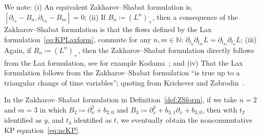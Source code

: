 \documentclass[5p,twocolumn]{elsarticle}
\newcommand*{\pa}{{\partial}}
\begin{document}
\begin{remark}
  We note:
  (i) An equivalent Zakharov--Shabat formulation is, $[\pa_{t_n}-B_n,\pa_{t_m}-B_m]=0$;
  (ii) If $B_n\coloneqq (L^n)_+$, then a consequence of the Zakharov--Shabat formulation is that the flows defined by the Lax formulation~\eqref{eq:KPLaxform},
  commute for any $n,m\in\mathbb N$: $\pa_{t_n}\pa_{t_m}L=\pa_{t_m}\pa_{t_n}L$;
  (iii) Again, if $B_n\coloneqq (L^n)_+$, then the Zakharov--Shabat formulation directly follows from the Lax formulation, see for example Kodama~\cite[Th.~2.1]{Kodama}; and
  (iv) That the Lax formulation follows from the Zakharov--Shabat formulation ``is true up to a triangular change of time variables''; quoting from Krichever and Zabrodin~\cite{KZ}.
\end{remark}
%
\begin{example}
In the Zakharov--Shabat formulation in Definition~\ref{def:ZSform}, if we take $n=2$ and $m=3$ in which $B_2\coloneqq\pa_x^2+b_{2,0}$ and $B_3\coloneqq\pa_x^3+b_{3,1}\pa_x+b_{3,0}$,
then with $t_2$ identified as $y$, and $t_3$ identified as $t$, we eventually obtain the noncommutative KP equation~\eqref{eq:ncKP}.
\end{example}
%
\end{document}
